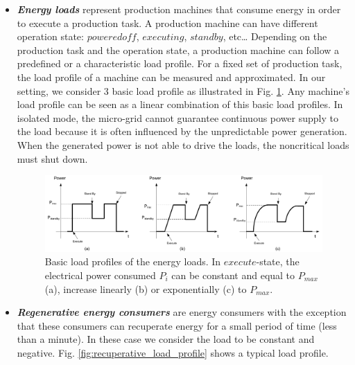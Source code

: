 \begin{itemize}
 \item{\textit{\textbf{Energy loads }} represent production machines that consume energy in order to execute a production task. A production machine can have different operation state: $powered off$, $executing$, $stand by$, etc… Depending on the production task and the operation state, a production machine can follow a predefined or a characteristic load profile. For a fixed set of production task, the load profile of a machine can be measured and approximated. In our setting, we consider 3 basic load profile as illustrated in Fig. \ref{fig:load_profile}. Any machine\rq{s} load profile can be seen as a linear combination of this basic load profiles. In isolated mode, the micro-grid cannot guarantee continuous power supply to the load because it is often influenced by the unpredictable power generation. When the generated power is not able to drive the loads, the noncritical loads must shut down.}
 
%
\begin{figure}[h!]
\includegraphics[scale=.40]{images/load_profile}
%
%
\caption{Basic load profiles of the energy loads. In $execute$-state,  the electrical power consumed $P_i$ can be constant and equal to $P_{max}$ (a), increase linearly (b) or exponentially (c) to $P_{max}$.}
\label{fig:load_profile}       %
\end{figure}

 
\item{\textit{\textbf{Regenerative energy consumers}} are energy consumers with the exception that these consumers can recuperate energy for a small period of time (less than a minute). In these case we consider the load to be constant and negative. Fig. \ref{fig:recuperative_load_profile} shows a typical load profile.}


\end{itemize}

